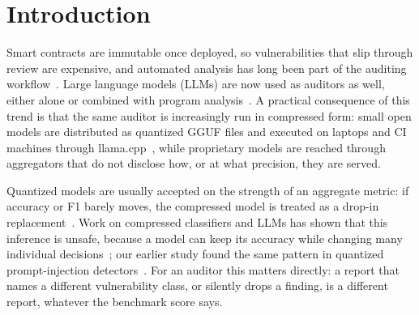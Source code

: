 \section{Introduction}\label{sec:intro}
Smart contracts are immutable once deployed, so vulnerabilities that slip through review are expensive, and automated analysis has long been part of the auditing workflow~\cite{luu2016making,atzei2017survey,feist2019slither,durieux2020empirical}. Large language models (LLMs) are now used as auditors as well, either alone or combined with program analysis~\cite{hu2023gptlens,sun2024gptscan,david2023manual,chen2025chatgpt}. A practical consequence of this trend is that the same auditor is increasingly run in compressed form: small open models are distributed as quantized GGUF files and executed on laptops and CI machines through llama.cpp~\cite{llamacpp}, while proprietary models are reached through aggregators that do not disclose how, or at what precision, they are served.

Quantized models are usually accepted on the strength of an aggregate metric: if accuracy or F1 barely moves, the compressed model is treated as a drop-in replacement~\cite{li2024evaluating,jin2024comprehensive}. Work on compressed classifiers and LLMs has shown that this inference is unsafe, because a model can keep its accuracy while changing many individual decisions~\cite{hooker2019forget,dutta2024accuracy,milanifard2016churn}; our earlier study found the same pattern in quantized prompt-injection detectors~\cite{anjum2026guardians}. For an auditor this matters directly: a report that names a different vulnerability class, or silently drops a finding, is a different report, whatever the benchmark score says.


